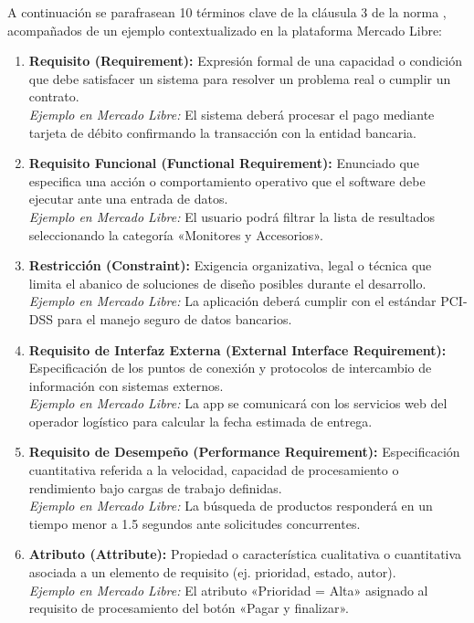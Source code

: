 \documentclass[11pt, a4paper]{article}
\begin{document}
A continuación se parafrasean 10 términos clave de la cláusula 3 de la norma \cite{iso29148}, acompañados de un ejemplo contextualizado en la plataforma Mercado Libre:

\begin{enumerate}
    \item \textbf{Requisito (Requirement):} Expresión formal de una capacidad o condición que debe satisfacer un sistema para resolver un problema real o cumplir un contrato. \\
    \textit{Ejemplo en Mercado Libre:} El sistema deberá procesar el pago mediante tarjeta de débito confirmando la transacción con la entidad bancaria.
    \item \textbf{Requisito Funcional (Functional Requirement):} Enunciado que especifica una acción o comportamiento operativo que el software debe ejecutar ante una entrada de datos. \\
    \textit{Ejemplo en Mercado Libre:} El usuario podrá filtrar la lista de resultados seleccionando la categoría «Monitores y Accesorios».
    \item \textbf{Restricción (Constraint):} Exigencia organizativa, legal o técnica que limita el abanico de soluciones de diseño posibles durante el desarrollo. \\
    \textit{Ejemplo en Mercado Libre:} La aplicación deberá cumplir con el estándar PCI-DSS para el manejo seguro de datos bancarios.
    \item \textbf{Requisito de Interfaz Externa (External Interface Requirement):} Especificación de los puntos de conexión y protocolos de intercambio de información con sistemas externos. \\
    \textit{Ejemplo en Mercado Libre:} La app se comunicará con los servicios web del operador logístico para calcular la fecha estimada de entrega.
    \item \textbf{Requisito de Desempeño (Performance Requirement):} Especificación cuantitativa referida a la velocidad, capacidad de procesamiento o rendimiento bajo cargas de trabajo definidas. \\
    \textit{Ejemplo en Mercado Libre:} La búsqueda de productos responderá en un tiempo menor a 1.5 segundos ante solicitudes concurrentes.
    \item \textbf{Atributo (Attribute):} Propiedad o característica cualitativa o cuantitativa asociada a un elemento de requisito (ej. prioridad, estado, autor). \\
    \textit{Ejemplo en Mercado Libre:} El atributo «Prioridad = Alta» asignado al requisito de procesamiento del botón «Pagar y finalizar».

\end{enumerate}
\end{document}
